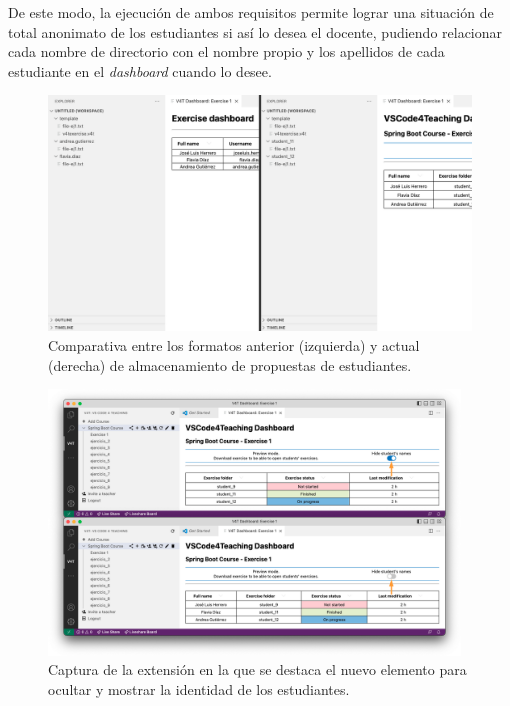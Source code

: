 De este modo, la ejecución de ambos requisitos permite lograr una situación de total anonimato de los estudiantes si así lo desea el docente, pudiendo relacionar cada nombre de directorio con el nombre propio y los apellidos de cada estudiante en el \textit{dashboard} cuando lo desee.

\begin{figure}[ht]
    \centering
    \includegraphics[width=\textwidth]{imagenes/utilizadas/4-3-implementacion/rf3-1.png}
    \caption{Comparativa entre los formatos anterior (izquierda) y actual (derecha) de almacenamiento de propuestas de estudiantes.}
    \label{fig:reqf3-1}
\end{figure}

\begin{figure}[ht]
    \centering
    \includegraphics[width=0.975\textwidth]{imagenes/utilizadas/4-3-implementacion/rf3-2.png}
    \caption{Captura de la extensión en la que se destaca el nuevo elemento para ocultar y mostrar la identidad de los estudiantes.}
    \label{fig:reqf3-2}
\end{figure}
